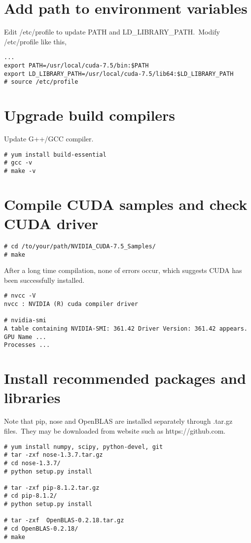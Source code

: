 \documentclass[UTF8,a4paper,12pt]{article}
\begin{document}
\section{Add path to environment variables}
Edit /etc/profile to update PATH and LD\_LIBRARY\_PATH.~Modify /etc/profile like this,
\begin{lstlisting}
...
export PATH=/usr/local/cuda-7.5/bin:$PATH
export LD_LIBRARY_PATH=/usr/local/cuda-7.5/lib64:$LD_LIBRARY_PATH
# source /etc/profile
\end{lstlisting}

\section{Upgrade build compilers}
Update G++/GCC compiler.
\begin{lstlisting}
# yum install build-essential
# gcc -v
# make -v
\end{lstlisting}

\section{Compile CUDA samples and check CUDA driver}
\begin{lstlisting}
# cd /to/your/path/NVIDIA_CUDA-7.5_Samples/
# make
\end{lstlisting}
After a long time compilation, none of errors occur, which suggests CUDA has been successfully installed.
\begin{lstlisting}
# nvcc -V
nvcc : NVIDIA (R) cuda compiler driver

# nvidia-smi
A table containing NVIDIA-SMI: 361.42 Driver Version: 361.42 appears.
GPU Name ...
Processes ...
\end{lstlisting}

\section{Install recommended packages and libraries}
Note that pip, nose and OpenBLAS are installed separately through .tar.gz files.~They may be downloaded from website such as https://github.com.
\begin{lstlisting}
# yum install numpy, scipy, python-devel, git
# tar -zxf nose-1.3.7.tar.gz
# cd nose-1.3.7/
# python setup.py install

# tar -zxf pip-8.1.2.tar.gz
# cd pip-8.1.2/
# python setup.py install

# tar -zxf  OpenBLAS-0.2.18.tar.gz
# cd OpenBLAS-0.2.18/
# make
\end{lstlisting}
\end{document}
